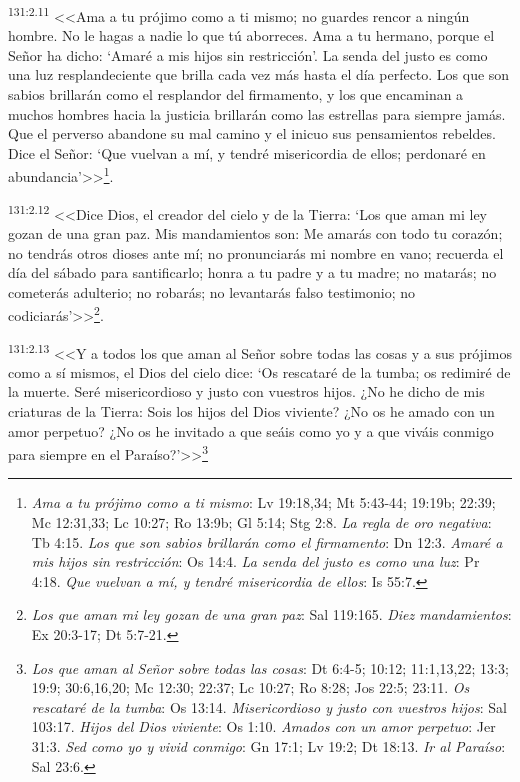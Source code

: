 \par 
\textsuperscript{131:2.11} <<Ama a tu prójimo como a ti mismo; no guardes rencor a ningún hombre. No le hagas a nadie lo que tú aborreces. Ama a tu hermano, porque el Señor ha dicho: `Amaré a mis hijos sin restricción'. La senda del justo es como una luz resplandeciente que brilla cada vez más hasta el día perfecto. Los que son sabios brillarán como el resplandor del firmamento, y los que encaminan a muchos hombres hacia la justicia brillarán como las estrellas para siempre jamás. Que el perverso abandone su mal camino y el inicuo sus pensamientos rebeldes. Dice el Señor: `Que vuelvan a mí, y tendré misericordia de ellos; perdonaré en abundancia'>>\footnote{\textit{Ama a tu prójimo como a ti mismo}: Lv 19:18,34; Mt 5:43-44; 19:19b; 22:39; Mc 12:31,33; Lc 10:27; Ro 13:9b; Gl 5:14; Stg 2:8. \textit{La regla de oro negativa}: Tb 4:15. \textit{Los que son sabios brillarán como el firmamento}: Dn 12:3. \textit{Amaré a mis hijos sin restricción}: Os 14:4. \textit{La senda del justo es como una luz}: Pr 4:18. \textit{Que vuelvan a mí, y tendré misericordia de ellos}: Is 55:7.}.

\par 
\textsuperscript{131:2.12} <<Dice Dios, el creador del cielo y de la Tierra:
`Los que aman mi ley gozan de una gran paz. Mis mandamientos son: Me amarás con todo tu corazón; no tendrás otros dioses ante mí; no pronunciarás mi nombre en vano; recuerda el día del sábado para santificarlo; honra a tu padre y a tu madre; no matarás; no cometerás adulterio; no robarás; no levantarás falso testimonio; no codiciarás'>>\footnote{\textit{Los que aman mi ley gozan de una gran paz}: Sal 119:165. \textit{Diez mandamientos}: Ex 20:3-17; Dt 5:7-21.}.

\par 
\textsuperscript{131:2.13} <<Y a todos los que aman al Señor sobre todas las cosas y a sus prójimos como a sí mismos, el Dios del cielo dice: `Os rescataré de la tumba; os redimiré de la muerte. Seré misericordioso y justo con vuestros hijos. ¿No he dicho de mis criaturas de la Tierra: Sois los hijos del Dios viviente? ¿No os he amado con un amor perpetuo? ¿No os he invitado a que seáis como yo y a que viváis conmigo para siempre en el Paraíso?'>>\footnote{ \textit{Los que aman al Señor sobre todas las cosas}: Dt 6:4-5; 10:12; 11:1,13,22; 13:3; 19:9; 30:6,16,20; Mc 12:30; 22:37; Lc 10:27; Ro 8:28; Jos 22:5; 23:11. \textit{Os rescataré de la tumba}: Os 13:14. \textit{Misericordioso y justo con vuestros hijos}: Sal 103:17. \textit{Hijos del Dios viviente}: Os 1:10. \textit{Amados con un amor perpetuo}: Jer 31:3. \textit{Sed como yo y vivid conmigo}: Gn 17:1; Lv 19:2; Dt 18:13. \textit{Ir al Paraíso}: Sal 23:6.}

